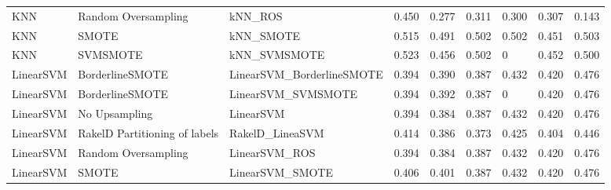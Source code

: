 \begin{tabular}{lllllllll}
                            KNN &           Random Oversampling &                                      kNN\_ROS & 0.450 &                     0.277 &                 0.311 &                  0.300 &                                   0.307 &     0.143 \\
                            KNN &                         SMOTE &                                    kNN\_SMOTE & 0.515 &                     0.491 &                 0.502 &                  0.502 &                                   0.451 &     0.503 \\
                            KNN &                      SVMSMOTE &                                 kNN\_SVMSMOTE & 0.523 &                     0.456 &                 0.502 &                      0 &                                   0.452 &     0.500 \\
                      LinearSVM &               BorderlineSMOTE &                    LinearSVM\_BorderlineSMOTE & 0.394 &                     0.390 &                 0.387 &                  0.432 &                                   0.420 &     0.476 \\
                      LinearSVM &               BorderlineSMOTE &                           LinearSVM\_SVMSMOTE & 0.394 &                     0.392 &                 0.387 &                      0 &                                   0.420 &     0.476 \\
                      LinearSVM &                 No Upsampling &                                    LinearSVM & 0.394 &                     0.384 &                 0.387 &                  0.432 &                                   0.420 &     0.476 \\
                      LinearSVM & RakelD Partitioning of labels &                              RakelD\_LineaSVM & 0.414 &                     0.386 &                 0.373 &                  0.425 &                                   0.404 &     0.446 \\
                      LinearSVM &           Random Oversampling &                                LinearSVM\_ROS & 0.394 &                     0.384 &                 0.387 &                  0.432 &                                   0.420 &     0.476 \\
                      LinearSVM &                         SMOTE &                              LinearSVM\_SMOTE & 0.406 &                     0.401 &                 0.387 &                  0.432 &                                   0.420 &     0.476 \\

\end{tabular}
